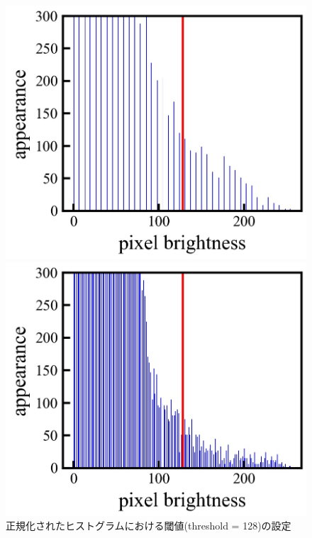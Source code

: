 \begin{figure}[h]
\begin{center}
\begin{minipage}{0.3\linewidth}
			\includegraphics[width=0.98\columnwidth]{./theory/figure/5/thre_norm_hist_1.jpg}
		\end{minipage}
		\begin{minipage}{0.3\linewidth}
			\includegraphics[width=0.98\columnwidth]{./theory/figure/5/thre_norm_hist_2.jpg}
		\end{minipage}
	\end{center}
	\caption{正規化されたヒストグラムにおける閾値(threshold = 128)の設定}
	\label{fig:thre_norm_hist}
\end{figure}

